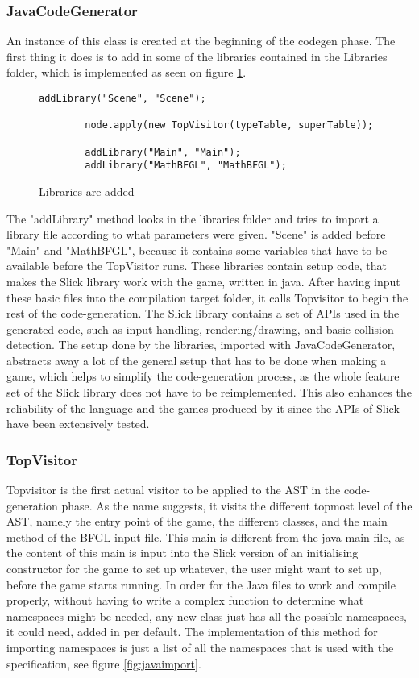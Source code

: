 \subsubsection{JavaCodeGenerator}
An instance of this class is created at the beginning of the codegen phase. The first thing it does is to add in some of the libraries contained in the Libraries folder, which is implemented as seen on figure \ref{fig:librarycodegen}.
\begin{figure}[H]
    \centering
    \begin{lstlisting}[style=gglang]
        addLibrary("Scene", "Scene");

        node.apply(new TopVisitor(typeTable, superTable));

        addLibrary("Main", "Main");
        addLibrary("MathBFGL", "MathBFGL");
    \end{lstlisting}
    \caption{Libraries are added \label{fig:librarycodegen}}
\end{figure}
The "addLibrary" method looks in the libraries folder and tries to import a library file according to what parameters were given. "Scene" is added before "Main" and "MathBFGL", because it contains some variables that have to be available before the TopVisitor runs.
These libraries contain setup code, that makes the Slick library work with the game, written in java. After having input these basic files into the compilation target folder, it calls Topvisitor to begin the rest of the code-generation. The Slick library contains a set of APIs used in the generated code, such as input handling, rendering/drawing, and basic collision detection. The setup done by the libraries, imported with JavaCodeGenerator, abstracts away a lot of the general setup that has to be done when making a game, which helps to simplify the code-generation process, as the whole feature set of the Slick library does not have to be reimplemented. This also enhances the reliability of the language and the games produced by it since the APIs of Slick have been extensively tested.

\subsubsection{TopVisitor}
Topvisitor is the first actual visitor to be applied to the AST in the code-generation phase. As the name suggests, it visits the different topmost level of the AST, namely the entry point of the game, the different classes, and the main method of the BFGL input file. This main is different from the java main-file, as the content of this main is input into the Slick version of an initialising constructor for the game to set up whatever, the user might want to set up, before the game starts running. 
In order for the Java files to work and compile properly, without having to write a complex function to determine what namespaces might be needed, any new class just has all the possible namespaces, it could need, added in per default. The implementation of this method for importing namespaces is just a list of all the namespaces that is used with the \lang{} specification, see figure \ref{fig:javaimport}.

